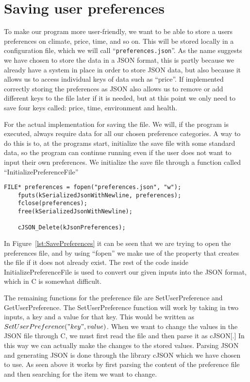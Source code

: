 \section{Saving user preferences}\label{sec:saving-user-preferences}

To make our program more user-friendly, we want to be able to store a users preferences on climate, price,
time, and so on.
This will be stored locally in a configuration file, which we will call
``\verb|preferences.json|''.
As the name suggests we have chosen to store the data in a JSON format, this is partly because we already have
a system in place in order to store JSON data, but also because it allows us to access individual keys of data such as
``price''.
If implemented correctly storing the preferences as JSON also allows us to remove or add different keys to the file
later if it is needed, but at this point we only need to save four keys called: price, time, environment and health.

For the actual implementation for saving the file.
We will, if the program is executed, always require data for all our chosen preference categories.
A way to do this is to, at the programs start, initialize the save file with some standard data, so the program can
continue running even if the user does not want to input their own preferences.
We initialize the save file through a function called ``InitializePreferenceFile''

\begin{lstlisting}[label={lst:SavePreferences}, caption={Saving preferences to file.}]
    FILE* preferences = fopen("preferences.json", "w");
    fputs(kSerializedJsonWithNewline, preferences);
    fclose(preferences);
    free(kSerializedJsonWithNewline);

    cJSON_Delete(kJsonPreferences);
\end{lstlisting}

In Figure~\ref{lst:SavePreferences} it can be seen that we are trying to open the preferences file,
and by using ``fopen'' we make use of the property that creates the file if it does not already exist.
The rest of the code inside InitializePreferenceFile is used to convert our given inputs into the JSON format, which in
C is somewhat difficult.

The remaining functions for the preference file are SetUserPreference and GetUserPreference.
The SetUserPreference function will work by taking in two inputs, a key and a value for that key.
This would be written as \(SetUserPreference("key", value)\).
When we want to change the values in the JSON file through C, we must first read the file and then parse it as cJSON[.]
In this way we can actually make the changes to the stored values.
Parsing JSON and generating JSON is done through the library cJSON which we have chosen to use.
As seen above it works by first parsing the content of the preference file and then searching for the item we want to
change.


